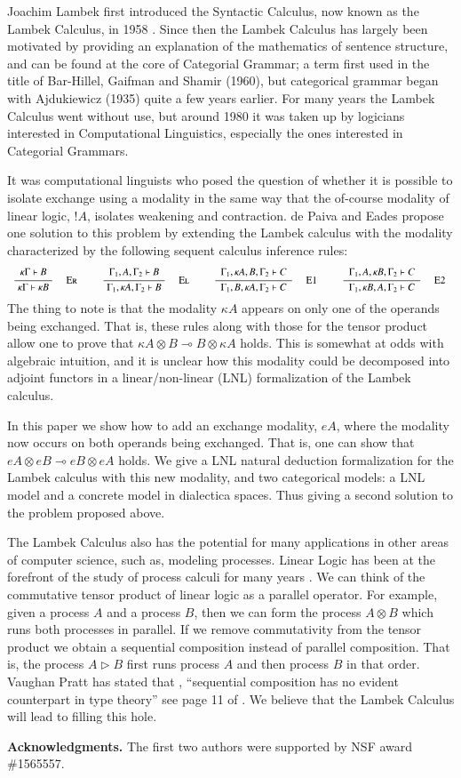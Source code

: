 Joachim Lambek first introduced the Syntactic Calculus, now known as
the Lambek Calculus, in 1958 \cite{Lambek1958}.  Since then the Lambek
Calculus has largely been motivated by providing an explanation of the
mathematics of sentence structure, and can be found at the core of
Categorial Grammar; a term first used in the title of Bar-Hillel,
Gaifman and Shamir (1960), but categorical grammar began with
Ajdukiewicz (1935) quite a few years earlier. For many years the
Lambek Calculus went without use, but around 1980 it was taken up by
logicians interested in Computational Linguistics, especially the ones
interested in Categorial Grammars.

It was computational linguists who posed the question of whether it is
possible to isolate exchange using a modality in the same way that the
of-course modality of linear logic, $!A$, isolates weakening and
contraction.  de Paiva and Eades \cite{dePaiva2018} propose one
solution to this problem by extending the Lambek calculus with the
modality characterized by the following sequent calculus inference
rules:
\[
\small
\begin{array}{ccccccccccccccccccccc}  
  {\displaystyle\frac{\begin{array}{l}   \kappa \Gamma \vdash \mathit{B}  \\ \end{array}}{ \kappa \Gamma \vdash \kappa \mathit{B} }\quad\textsc{ {\textsc{Er}}{} }} & & {\displaystyle\frac{\begin{array}{l}  \Gamma_{{\mathrm{1}}} , \mathit{A} , \Gamma_{{\mathrm{2}}} \vdash \mathit{B}  \\ \end{array}}{ \Gamma_{{\mathrm{1}}} , \kappa \mathit{A} , \Gamma_{{\mathrm{2}}} \vdash \mathit{B} }\quad\textsc{ {\textsc{El}}{} }} & & {\displaystyle\frac{\begin{array}{l}  \Gamma_{{\mathrm{1}}} , \kappa \mathit{A} , \mathit{B} , \Gamma_{{\mathrm{2}}} \vdash \mathit{C}  \\ \end{array}}{ \Gamma_{{\mathrm{1}}} , \mathit{B} , \kappa \mathit{A} , \Gamma_{{\mathrm{2}}} \vdash \mathit{C} }\quad\textsc{ {\textsc{E1}}{} }} & & {\displaystyle\frac{\begin{array}{l}  \Gamma_{{\mathrm{1}}} , \mathit{A} , \kappa \mathit{B} , \Gamma_{{\mathrm{2}}} \vdash \mathit{C}  \\ \end{array}}{ \Gamma_{{\mathrm{1}}} , \kappa \mathit{B} , \mathit{A} , \Gamma_{{\mathrm{2}}} \vdash \mathit{C} }\quad\textsc{ {\textsc{E2}}{} }} 
\end{array}
\]
The thing to note is that the modality $\kappa A$ appears on only one
of the operands being exchanged.  That is, these rules along with
those for the tensor product allow one to prove that $\kappa A \otimes
B \multimap B \otimes \kappa A$ holds.  This is somewhat at odds with
algebraic intuition, and it is unclear how this modality could be
decomposed into adjoint functors in a linear/non-linear (LNL)
formalization of the Lambek calculus.

In this paper we show how to add an exchange modality, $eA$, where the
modality now occurs on both operands being exchanged. That is, one can
show that $eA \otimes eB \multimap eB \otimes eA$ holds.  We give a
LNL natural deduction formalization for the Lambek calculus with this
new modality, and two categorical models: a LNL model and a concrete
model in dialectica spaces.  Thus giving a second solution to the
problem proposed above.

The Lambek Calculus also has the potential for many applications in
other areas of computer science, such as, modeling processes.  Linear
Logic has been at the forefront of the study of process calculi for
many years \cite{HONDA20102223,Pratt:1997,ABRAMSKY19945}. We can think
of the commutative tensor product of linear logic as a parallel
operator.  For example, given a process $A$ and a process $B$, then we
can form the process $A \otimes B$ which runs both processes in
parallel.  If we remove commutativity from the tensor product we
obtain a sequential composition instead of parallel composition.  That
is, the process $A \rhd B$ first runs process $A$ and then process $B$
in that order.  Vaughan Pratt has stated that , ``sequential
composition has no evident counterpart in type theory'' see page 11 of
\cite{Pratt:1997}.  We believe that the Lambek Calculus will lead to
filling this hole.  

\textbf{Acknowledgments.}  The first two authors were supported by NSF
award \#1565557.

